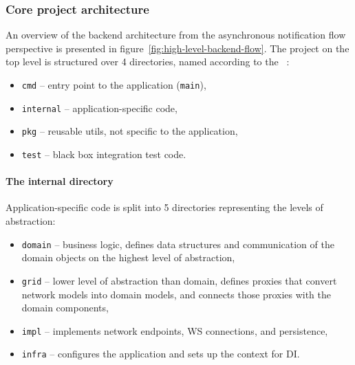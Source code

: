 \subsubsection{Core project architecture}\label{sec:core-project-architecture}

An overview of the backend architecture
from the asynchronous notification flow perspective
is presented in figure~\ref{fig:high-level-backend-flow}.
The project on the top level is structured over 4 directories,
named according to
the ~\cite{quest_standard_2022}:

\begin{itemize}
      \item
            \texttt{cmd} -- entry point to the application (\texttt{main}),
      \item
            \texttt{internal} -- application-specific code,
      \item
            \texttt{pkg} -- reusable utils, not specific to the application,
      \item
            \texttt{test} -- black box integration test code.
\end{itemize}

\paragraph*{The internal directory}\label{sec:the-internal-directory}

Application-specific code is split into 5 directories
representing the levels of abstraction:

\begin{itemize}
      \item
            \texttt{domain} -- business logic,
            defines data structures and communication of the domain objects
            on the highest level of abstraction,
      \item
            \texttt{grid} -- lower level of abstraction than domain,
            defines proxies that convert network models into domain models,
            and connects those proxies with the domain components,
      \item
            \texttt{impl} -- implements network endpoints,
            \ac{WS} connections, and persistence,
      \item
            \texttt{infra} -- configures the application
            and sets up the context for \ac{DI}.
\end{itemize}

